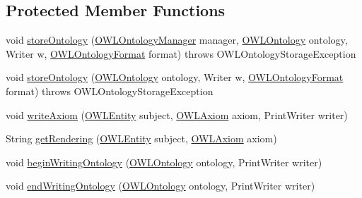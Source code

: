 \subsection*{Protected Member Functions}
\begin{DoxyCompactItemize}
\item 
void \hyperlink{classuk_1_1ac_1_1manchester_1_1cs_1_1owlapi_1_1dlsyntax_1_1_d_l_syntax_ontology_storer_base_a819e16e66244df7617d78c4eb414dcd7}{store\-Ontology} (\hyperlink{interfaceorg_1_1semanticweb_1_1owlapi_1_1model_1_1_o_w_l_ontology_manager}{O\-W\-L\-Ontology\-Manager} manager, \hyperlink{interfaceorg_1_1semanticweb_1_1owlapi_1_1model_1_1_o_w_l_ontology}{O\-W\-L\-Ontology} ontology, Writer w, \hyperlink{classorg_1_1semanticweb_1_1owlapi_1_1model_1_1_o_w_l_ontology_format}{O\-W\-L\-Ontology\-Format} format)  throws O\-W\-L\-Ontology\-Storage\-Exception 
\item 
void \hyperlink{classuk_1_1ac_1_1manchester_1_1cs_1_1owlapi_1_1dlsyntax_1_1_d_l_syntax_ontology_storer_base_a3062a504dc52371862c7ac3efaf15b8d}{store\-Ontology} (\hyperlink{interfaceorg_1_1semanticweb_1_1owlapi_1_1model_1_1_o_w_l_ontology}{O\-W\-L\-Ontology} ontology, Writer w, \hyperlink{classorg_1_1semanticweb_1_1owlapi_1_1model_1_1_o_w_l_ontology_format}{O\-W\-L\-Ontology\-Format} format)  throws O\-W\-L\-Ontology\-Storage\-Exception 
\item 
void \hyperlink{classuk_1_1ac_1_1manchester_1_1cs_1_1owlapi_1_1dlsyntax_1_1_d_l_syntax_ontology_storer_base_a2c8047c52e9d6b065266e892dd1e77c7}{write\-Axiom} (\hyperlink{interfaceorg_1_1semanticweb_1_1owlapi_1_1model_1_1_o_w_l_entity}{O\-W\-L\-Entity} subject, \hyperlink{interfaceorg_1_1semanticweb_1_1owlapi_1_1model_1_1_o_w_l_axiom}{O\-W\-L\-Axiom} axiom, Print\-Writer writer)
\item 
String \hyperlink{classuk_1_1ac_1_1manchester_1_1cs_1_1owlapi_1_1dlsyntax_1_1_d_l_syntax_ontology_storer_base_a1d6305a81be1c472906be3078bb66531}{get\-Rendering} (\hyperlink{interfaceorg_1_1semanticweb_1_1owlapi_1_1model_1_1_o_w_l_entity}{O\-W\-L\-Entity} subject, \hyperlink{interfaceorg_1_1semanticweb_1_1owlapi_1_1model_1_1_o_w_l_axiom}{O\-W\-L\-Axiom} axiom)
\item 
void \hyperlink{classuk_1_1ac_1_1manchester_1_1cs_1_1owlapi_1_1dlsyntax_1_1_d_l_syntax_ontology_storer_base_a6b4932738739498ed87d42ac78289e08}{begin\-Writing\-Ontology} (\hyperlink{interfaceorg_1_1semanticweb_1_1owlapi_1_1model_1_1_o_w_l_ontology}{O\-W\-L\-Ontology} ontology, Print\-Writer writer)
\item 
void \hyperlink{classuk_1_1ac_1_1manchester_1_1cs_1_1owlapi_1_1dlsyntax_1_1_d_l_syntax_ontology_storer_base_a8d70b0263a425add327e04353cfb370e}{end\-Writing\-Ontology} (\hyperlink{interfaceorg_1_1semanticweb_1_1owlapi_1_1model_1_1_o_w_l_ontology}{O\-W\-L\-Ontology} ontology, Print\-Writer writer)

\end{DoxyCompactItemize}
